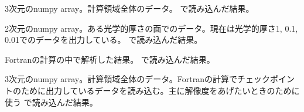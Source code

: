 \documentclass[letterpaper,10pt,dvipdfmx,report]{sphinxmanual}
\begin{document}
\begin{fulllineitems}
\label{\detokenize{io:R2D2.R2D2_data.qq}}
\pysigstartsignatures
{}
\pysigstopsignatures
\sphinxAtStartPar
3次元のnumpy array。計算領域全体のデータ。{\hyperref[\detokenize{io:R2D2.R2D2_data.read_qq}]{}} で読み込んだ結果。

\end{fulllineitems}


\begin{fulllineitems}
\label{\detokenize{io:R2D2.R2D2_data.qt}}
\pysigstartsignatures
{}
\pysigstopsignatures
\sphinxAtStartPar
2次元のnumpy array。ある光学的厚さの面でのデータ。現在は光学的厚さ1, 0.1, 0.01でのデータを出力している。 {\hyperref[\detokenize{io:R2D2.R2D2_data.read_qq_tau}]{}} で読み込んだ結果。

\end{fulllineitems}


\begin{fulllineitems}
\label{\detokenize{io:R2D2.R2D2_data.vc}}
\pysigstartsignatures
{}
\pysigstopsignatures
\sphinxAtStartPar
Fortranの計算の中で解析した結果。 {\hyperref[\detokenize{io:R2D2.R2D2_data.read_vc}]{}} で読み込んだ結果。

\end{fulllineitems}


\begin{fulllineitems}
\label{\detokenize{io:R2D2.R2D2_data.qc}}
\pysigstartsignatures
{}
\pysigstopsignatures
\sphinxAtStartPar
3次元のnumpy array。計算領域全体のデータ。Fortranの計算でチェックポイントのために出力しているデータを読み込む。主に解像度をあげたいときのために使う {\hyperref[\detokenize{io:R2D2.R2D2_data.read_qq_check}]{}} で読み込んだ結果。

\end{fulllineitems}
\end{document}

